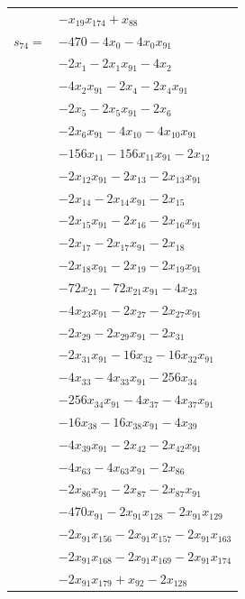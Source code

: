 \begin{longtable}{@{}r@{\;}l@{}}
 & \(\displaystyle -x_{19}x_{174} +x_{88}\) \\[3pt]
\(s_{74}=\) & \(\displaystyle -470 -4x_{0} -4x_{0}x_{91}\) \\
 & \(\displaystyle -2x_{1} -2x_{1}x_{91} -4x_{2}\) \\
 & \(\displaystyle -4x_{2}x_{91} -2x_{4} -2x_{4}x_{91}\) \\
 & \(\displaystyle -2x_{5} -2x_{5}x_{91} -2x_{6}\) \\
 & \(\displaystyle -2x_{6}x_{91} -4x_{10} -4x_{10}x_{91}\) \\
 & \(\displaystyle -156x_{11} -156x_{11}x_{91} -2x_{12}\) \\
 & \(\displaystyle -2x_{12}x_{91} -2x_{13} -2x_{13}x_{91}\) \\
 & \(\displaystyle -2x_{14} -2x_{14}x_{91} -2x_{15}\) \\
 & \(\displaystyle -2x_{15}x_{91} -2x_{16} -2x_{16}x_{91}\) \\
 & \(\displaystyle -2x_{17} -2x_{17}x_{91} -2x_{18}\) \\
 & \(\displaystyle -2x_{18}x_{91} -2x_{19} -2x_{19}x_{91}\) \\
 & \(\displaystyle -72x_{21} -72x_{21}x_{91} -4x_{23}\) \\
 & \(\displaystyle -4x_{23}x_{91} -2x_{27} -2x_{27}x_{91}\) \\
 & \(\displaystyle -2x_{29} -2x_{29}x_{91} -2x_{31}\) \\
 & \(\displaystyle -2x_{31}x_{91} -16x_{32} -16x_{32}x_{91}\) \\
 & \(\displaystyle -4x_{33} -4x_{33}x_{91} -256x_{34}\) \\
 & \(\displaystyle -256x_{34}x_{91} -4x_{37} -4x_{37}x_{91}\) \\
 & \(\displaystyle -16x_{38} -16x_{38}x_{91} -4x_{39}\) \\
 & \(\displaystyle -4x_{39}x_{91} -2x_{42} -2x_{42}x_{91}\) \\
 & \(\displaystyle -4x_{63} -4x_{63}x_{91} -2x_{86}\) \\
 & \(\displaystyle -2x_{86}x_{91} -2x_{87} -2x_{87}x_{91}\) \\
 & \(\displaystyle -470x_{91} -2x_{91}x_{128} -2x_{91}x_{129}\) \\
 & \(\displaystyle -2x_{91}x_{156} -2x_{91}x_{157} -2x_{91}x_{163}\) \\
 & \(\displaystyle -2x_{91}x_{168} -2x_{91}x_{169} -2x_{91}x_{174}\) \\
 & \(\displaystyle -2x_{91}x_{179} +x_{92} -2x_{128}\) \\

\end{longtable}

